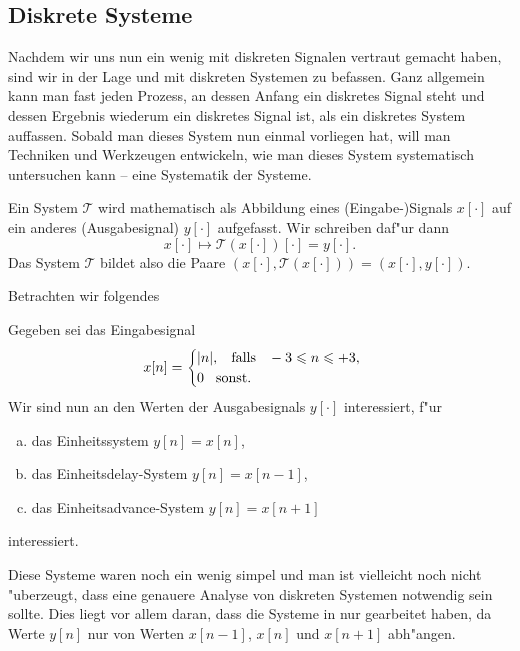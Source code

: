 \subsection{Diskrete Systeme}
%
%
Nachdem wir uns nun ein wenig mit diskreten Signalen vertraut gemacht haben, sind wir in der Lage und mit diskreten Systemen zu befassen.
Ganz allgemein kann man fast jeden Prozess, an dessen Anfang ein diskretes Signal steht und dessen Ergebnis wiederum ein diskretes Signal ist, als ein diskretes System auffassen.
Sobald man dieses System nun einmal vorliegen hat, will man Techniken und Werkzeugen entwickeln, wie man dieses System systematisch untersuchen kann -- eine Systematik der Systeme.

Ein System $\mathcal{T}$ wird mathematisch als Abbildung eines (Eingabe-)Signals $x[\cdot]$ auf ein anderes (Ausgabesignal) $y[\cdot]$ aufgefasst. Wir schreiben daf"ur dann
%
\begin{equation}\label{eq:gen_disc_sys}
    x[\cdot] \mapsto \mathcal{T}(x[\cdot])[\cdot] = y[\cdot].
\end{equation}
%
Das System $\mathcal{T}$ bildet also die Paare $(x[\cdot], \mathcal{T}(x[\cdot])) = (x[\cdot], y[\cdot])$.

Betrachten wir folgendes
\begin{Bsp}\label{ex:simple_sys}
    Gegeben sei das Eingabesignal
    \[
    x[n] = \begin{cases}
        {\left| n \right|}, {\hspace{3mm} \text{falls} \hspace{3mm}} -3 \leqslant n \leqslant +3, \\
        0 {\hspace{3mm} \text{sonst.} \hspace{3mm}}
    \end{cases}
    \]
    Wir sind nun an den Werten der Ausgabesignals $y[\cdot]$ interessiert, f"ur
    \begin{enumerate}[a)]
        \item das Einheitssystem $y[n] = x[n]$,
        \item das Einheitsdelay-System $y[n] = x[n-1]$,
        \item das Einheitsadvance-System $y[n] = x[n+1]$
    \end{enumerate}
    interessiert.
\end{Bsp}
Diese Systeme waren noch ein wenig simpel und man ist vielleicht noch nicht "uberzeugt, dass eine genauere Analyse von diskreten Systemen notwendig sein sollte.
Dies liegt vor allem daran, dass die Systeme in  nur  gearbeitet haben, da Werte $y[n]$ nur von Werten $x[n-1]$, $x[n]$ und $x[n+1]$ abh"angen.

